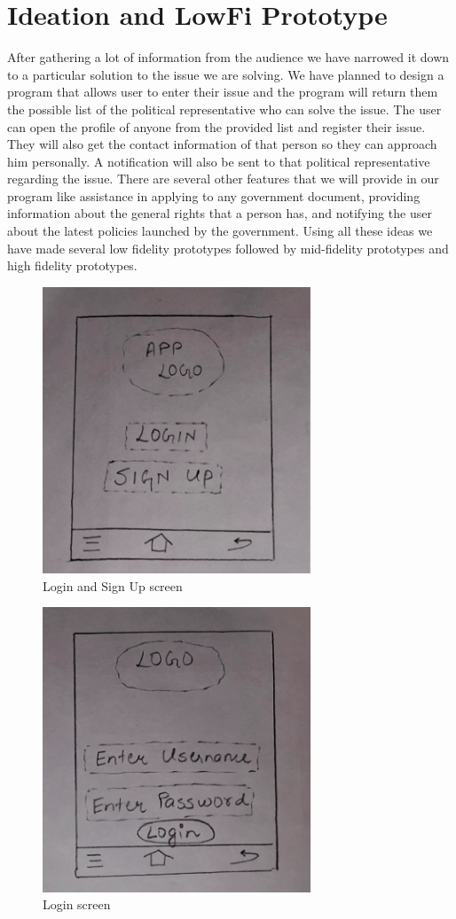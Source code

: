 \documentclass[acmtog]{acmart}
\begin{document}
\section{Ideation and LowFi Prototype}
After gathering a lot of information from the audience we have narrowed it down to a particular solution to the issue we are solving. We have planned to design a program that allows user to enter their issue and the program will return them the possible list of the political representative who can solve the issue. The user can open the profile of anyone from the provided list and register their issue. They will also get the contact information of that person so they can approach him personally. A notification will also be sent to that political representative regarding the issue. There are several other features that we will provide in our program like assistance in applying to any government document, providing information about the general rights that a person has, and notifying the user about the latest policies launched by the government. Using all these ideas we have made several low fidelity prototypes followed by mid-fidelity prototypes and high fidelity prototypes.
\begin{figure}[H]
    \includegraphics[width=8cm]{Resources/Login_signUp.jpg}
    \caption{Login and Sign Up screen}
    \label{fig:Login_signup}
\end{figure}
\begin{figure}[H]
    \includegraphics[width=8cm]{Resources/Login.jpg}
    \caption{Login screen}
    \label{fig:Login}
\end{figure}
\end{document}
